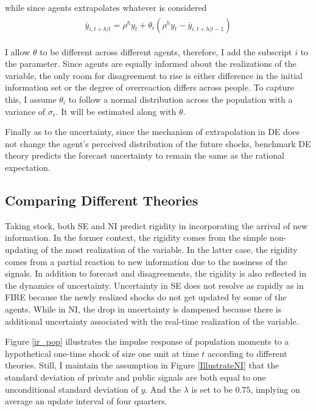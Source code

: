 \documentclass[12pt]{article}
\begin{document}
 while since agents extrapolates whatever is considered 
		\begin{eqnarray}
		\begin{aligned}
			\bar y_{i,t+h|t}  =  \rho^h y_{t} + \theta_i (\rho^h y_t - \bar y_{i,t+h|t-1})
		\end{aligned}
	\end{eqnarray}
	
	 I allow $\theta$ to be different across different agents, therefore, I add the subscript $i$ to the parameter. Since agents are equally informed about the realizations of the variable, the only room for disagreement to rise is either difference in the initial information set or the degree of overreaction differs across people. To capture this, I assume $\theta_i$ to follow a normal distribution across the population with a variance of $\sigma_{\epsilon}$. It will be estimated along with $\theta$. 
	 
	 Finally as to the uncertainty, since the mechanism of extrapolation in DE does not change the agent's perceived distribution of the future shocks, benchmark DE theory predicts the forecast uncertainty to remain the same as the rational expectation. 

 	
	\subsection{Comparing Different Theories}
	
	Taking stock, both SE and NI predict rigidity in incorporating the arrival of new information. In the former context, the rigidity comes from the simple non-updating of the most realization of the variable. In the latter case, the rigidity comes from a partial reaction to new information due to the nosiness of the signals.  In addition to forecast and disagreements, the rigidity is also reflected in the dynamics of uncertainty.  Uncertainty in SE does not resolve as rapidly as in FIRE because the newly realized shocks do not get updated by some of the agents. While in NI, the drop in uncertainty is dampened because there is additional uncertainty associated with the real-time realization of the variable.  
	
	Figure \ref{ir_pop} illustrates the impulse response of population moments to a hypothetical one-time shock of size one unit at time $t$ according to different theories. Still, I maintain the assumption in Figure \ref{IllustrateNI} that the standard deviation of private and public signals are both equal to one unconditional standard deviation of $y$.  And the $\lambda$ is set to be $0.75$, implying on average an update interval of four quarters.  
	
\end{document}
